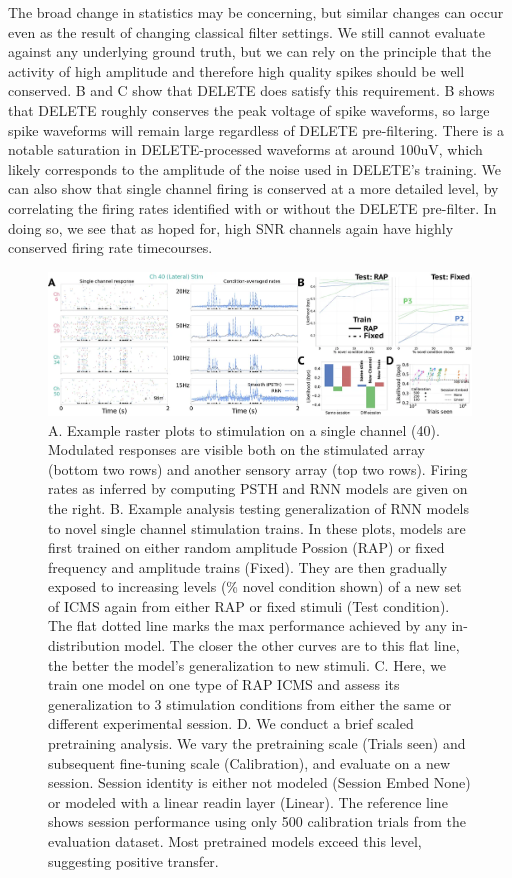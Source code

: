 \documentclass[12pt,oneside]{report}
\begin{document}
The broad change in statistics may be concerning, but similar changes can occur even as the result of changing classical filter settings. We still cannot evaluate against any underlying ground truth, but we can rely on the principle that the activity of high amplitude and therefore high quality spikes should be well conserved. B and C show that DELETE does satisfy this requirement. B shows that DELETE roughly conserves the peak voltage of spike waveforms, so large spike waveforms will remain large regardless of DELETE pre-filtering. There is a notable saturation in DELETE-processed waveforms at around 100uV, which likely corresponds to the amplitude of the noise used in DELETE’s training. We can also show that single channel firing is conserved at a more detailed level, by correlating the firing rates identified with or without the DELETE pre-filter. In doing so, we see that as hoped for, high SNR channels again have highly conserved firing rate timecourses.



\begin{figure}[h]
  \centering
  \includegraphics[width=0.8\linewidth]{ch4_icms_taxonomy.png}
  \caption{A. Example raster plots to stimulation on a single channel (40). Modulated responses are visible both on the stimulated array (bottom two rows) and another sensory array (top two rows). Firing rates as inferred by computing PSTH and RNN models are given on the right. B. Example analysis testing generalization of RNN models to novel single channel stimulation trains. In these plots, models are first trained on either random amplitude Possion (RAP) or fixed frequency and amplitude trains (Fixed). They are then gradually exposed to increasing levels (\% novel condition shown) of a new set of ICMS again from either RAP or fixed stimuli (Test condition). The flat dotted line marks the max performance achieved by any in-distribution model. The closer the other curves are to this flat line, the better the model's generalization to new stimuli. C. Here, we train one model on one type of RAP ICMS and assess its generalization to 3 stimulation conditions from either the same or different experimental session. D. We conduct a brief scaled pretraining analysis. We vary the pretraining scale (Trials seen) and subsequent fine-tuning scale (Calibration), and evaluate on a new session. Session identity is either not modeled (Session Embed None) or modeled with a linear readin layer (Linear). The reference line shows session performance using only 500 calibration trials from the evaluation dataset. Most pretrained models exceed this level, suggesting positive transfer.}
  \label{fig:icms_taxonomy}
\end{figure}
\end{document}
